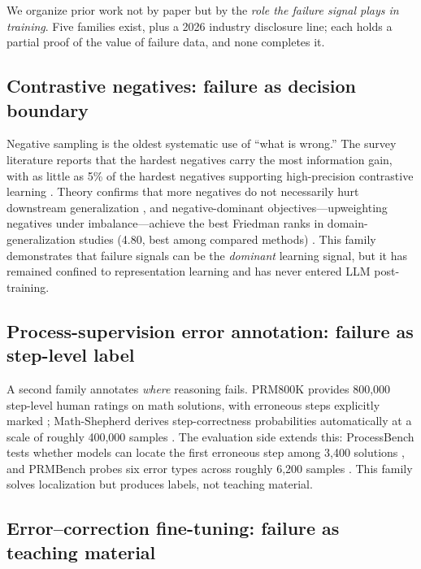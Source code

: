 \documentclass[10pt]{article}
\begin{document}
We organize prior work not by paper but by the \emph{role the failure signal plays in training}. Five families exist, plus a 2026 industry disclosure line; each holds a partial proof of the value of failure data, and none completes it.

\subsection{Contrastive negatives: failure as decision boundary}

Negative sampling is the oldest systematic use of ``what is wrong.'' The survey literature reports that the hardest negatives carry the most information gain, with as little as 5\% of the hardest negatives supporting high-precision contrastive learning \cite{yang2024negsampling}. Theory confirms that more negatives do not necessarily hurt downstream generalization \cite{awasthi2022negative}, and negative-dominant objectives---upweighting negatives under imbalance---achieve the best Friedman ranks in domain-generalization studies (4.80, best among compared methods) \cite{cao2026ndcl}. This family demonstrates that failure signals can be the \emph{dominant} learning signal, but it has remained confined to representation learning and has never entered LLM post-training.

\subsection{Process-supervision error annotation: failure as step-level label}

A second family annotates \emph{where} reasoning fails. PRM800K provides 800,000 step-level human ratings on math solutions, with erroneous steps explicitly marked \cite{lightman2023verify}; Math-Shepherd derives step-correctness probabilities automatically at a scale of roughly 400,000 samples \cite{wang2024mathshepherd}. The evaluation side extends this: ProcessBench tests whether models can locate the first erroneous step among 3,400 solutions \cite{zheng2024processbench}, and PRMBench probes six error types across roughly 6,200 samples \cite{song2025prmbench}. This family solves localization but produces labels, not teaching material.

\subsection{Error--correction fine-tuning: failure as teaching material}
\end{document}
